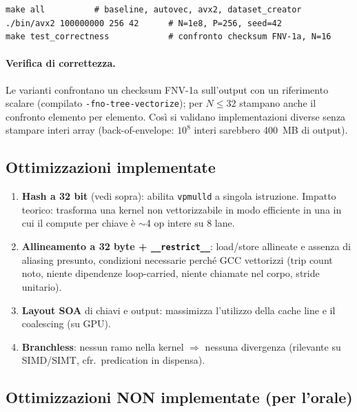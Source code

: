 \documentclass[11pt,a4paper]{article}
\theoremstyle{remark}
\begin{document}
\begin{lstlisting}[style=bash, caption={Build e run del Modulo 1.}]
make all          # baseline, autovec, avx2, dataset_creator
./bin/avx2 100000000 256 42      # N=1e8, P=256, seed=42
make test_correctness            # confronto checksum FNV-1a, N=16
\end{lstlisting}

\paragraph{Verifica di correttezza.} Le varianti confrontano un checksum FNV-1a sull'output con un riferimento scalare (compilato \texttt{-fno-tree-vectorize}); per $N\le 32$ stampano anche il confronto elemento per elemento. Cos\`i si validano implementazioni diverse senza stampare interi array (back-of-envelope: $10^8$ interi sarebbero 400~MB di output).

\subsection{Ottimizzazioni implementate}

\begin{enumerate}
  \item \textbf{Hash a 32 bit} (vedi sopra): abilita \texttt{vpmulld} a singola istruzione. Impatto teorico: trasforma una kernel non vettorizzabile in modo efficiente in una in cui il compute per chiave \`e $\sim$4 op intere su 8 lane.
  \item \textbf{Allineamento a 32 byte + \texttt{\_\_restrict\_\_}}: load/store allineate e assenza di aliasing presunto, condizioni necessarie perch\'e GCC vettorizzi (trip count noto, niente dipendenze loop-carried, niente chiamate nel corpo, stride unitario).
  \item \textbf{Layout SOA} di chiavi e output: massimizza l'utilizzo della cache line e il coalescing (su GPU).
  \item \textbf{Branchless}: nessun ramo nella kernel $\Rightarrow$ nessuna divergenza (rilevante su SIMD/SIMT, cfr.\ predication in dispensa).
\end{enumerate}

\subsection{Ottimizzazioni NON implementate (per l'orale)}
\end{document}
